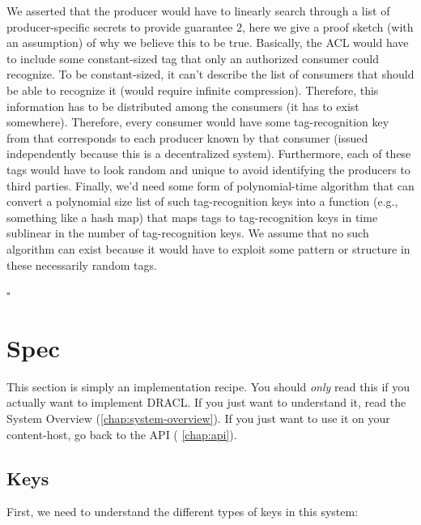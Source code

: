 \documentclass[pdftex,12pt,a4papaer,twoside,notitlepage]{report}
\begin{document}
\begin{appendices}
We asserted that the producer would have to linearly search through a list of
producer-specific secrets to provide guarantee 2, here we give a proof sketch
(with an assumption) of why we believe this to be true. Basically, the ACL would
have to include some constant-sized tag that only an authorized consumer could
recognize. To be constant-sized, it can't describe the list of consumers that
should be able to recognize it (would require infinite compression). Therefore,
this information has to be distributed among the consumers (it has to exist
somewhere). Therefore, every consumer would have some tag-recognition key from
that corresponds to each producer known by that consumer (issued independently
because this is a decentralized system). Furthermore, each of these tags would
have to look random and unique to avoid identifying the producers to third
parties. Finally, we'd need some form of polynomial-time algorithm that can
convert a polynomial size list of such tag-recognition keys into a function
(e.g., something like a hash map) that maps tags to tag-recognition keys in time
sublinear in the number of tag-recognition keys. We assume that no such
algorithm can exist because it would have to exploit some pattern or structure
in these necessarily random tags.

{\hfill $\square$}

\chapter{Spec}

This section is simply an implementation recipe. You should \emph{only} read
this if you actually want to implement DRACL. If you just want to understand it,
read the System Overview (\cref{chap:system-overview}). If you just want to use
it on your content-host, go back to the API ( \cref{chap:api}).

\section{Keys}

First, we need to understand the different types of keys in this system:


\end{appendices}
\end{document}

